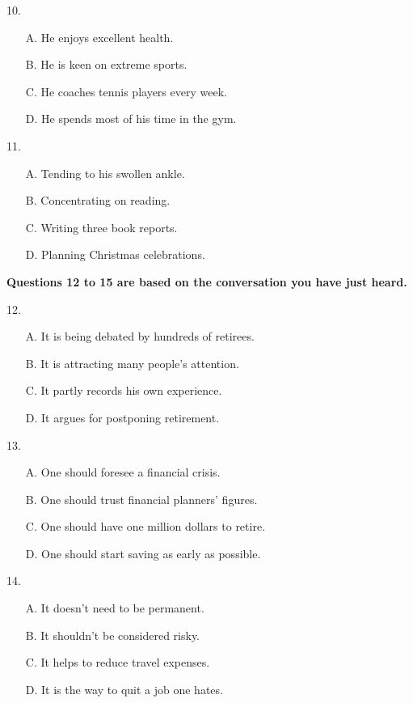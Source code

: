 \documentclass[UTF8,11pt]{ctexart}
\begin{document}
10.


\begin{itemize}[leftmargin=2em,itemsep=.2em,topsep=.4em]\item[A.] He enjoys excellent health.
\item[B.] He is keen on extreme sports.
\item[C.] He coaches tennis players every week.
\item[D.] He spends most of his time in the gym.
\end{itemize}

11.


\begin{itemize}[leftmargin=2em,itemsep=.2em,topsep=.4em]\item[A.] Tending to his swollen ankle.
\item[B.] Concentrating on reading.
\item[C.] Writing three book reports.
\item[D.] Planning Christmas celebrations.
\end{itemize}

\textbf{Questions 12 to 15 are based on the conversation you have just heard.}


12.


\begin{itemize}[leftmargin=2em,itemsep=.2em,topsep=.4em]\item[A.] It is being debated by hundreds of retirees.
\item[B.] It is attracting many people’s attention.
\item[C.] It partly records his own experience.
\item[D.] It argues for postponing retirement.
\end{itemize}

13.


\begin{itemize}[leftmargin=2em,itemsep=.2em,topsep=.4em]\item[A.] One should foresee a financial crisis.
\item[B.] One should trust financial planners’ figures.
\item[C.] One should have one million dollars to retire.
\item[D.] One should start saving as early as possible.
\end{itemize}

14.


\begin{itemize}[leftmargin=2em,itemsep=.2em,topsep=.4em]\item[A.] It doesn’t need to be permanent.
\item[B.] It shouldn’t be considered risky.
\item[C.] It helps to reduce travel expenses.
\item[D.] It is the way to quit a job one hates.
\end{itemize}
\end{document}
